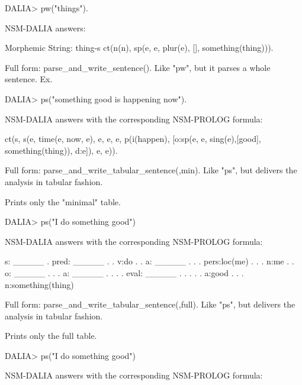 \documentclass[11pt]{article}
\begin{document}
\begin{description}
\begin{code}
DALIA> pw("things").
\end{code}

NSM-DALIA answers:

\begin{code}
Morphemic String: thing-s
ct(n(n), sp(e, e, plur(e), [], something(thing))).
\end{code}

Full form: parse_and_write_sentence().
Like "pw", but it parses a whole sentence. Ex.

\begin{code}
DALIA> ps("something good is happening now").
\end{code}

NSM-DALIA answers with the corresponding NSM-PROLOG formula:

\begin{code}
ct(s, s(e, time(e, now, e), e, e, e,
        p(i(happen),
          [o:sp(e, e, sing(e),[good], something(thing)),
           d:e]),
        e, e)).
\end{code}

Full form: parse_and_write_tabular_sentence(,min).
Like "ps", but delivers the analysis in tabular fashion.

Prints only the "minimal" table.

\begin{code}
DALIA> ps("I do something good")
\end{code}

NSM-DALIA answers with the corresponding NSM-PROLOG formula:

\begin{code}
s: _____
. pred: _____
. . v:do
. . a: _____
. . . pers:loc(me)
. . . n:me
. . o: _____
. . . a: _____
. . . . eval: _____
. . . . . a:good
. . . n:something(thing)
\end{code}

Full form: parse_and_write_tabular_sentence(,full).
Like "ps", but delivers the analysis in tabular fashion.

Prints only the full table.

\begin{code}
DALIA> ps("I do something good")
\end{code}

NSM-DALIA answers with the corresponding NSM-PROLOG formula:


\end{description}
\end{document}
